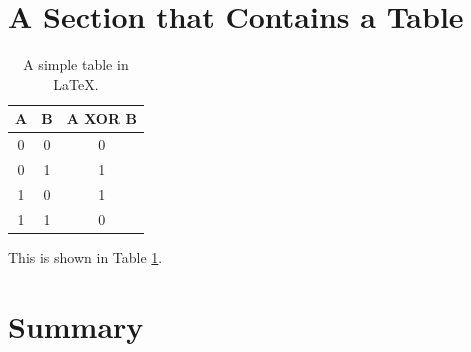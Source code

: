 \section{A Section that Contains a Table}


\begin{table}[ht]
\center
\begin{tabular}{cc|c}
A & B & A XOR B\\
\hline
0 & 0 & 0\\
0 & 1 & 1\\
1 & 0 & 1\\
1 & 1 & 0\\
\end{tabular}
\caption{A simple table in \LaTeX.}
\label{tab:xor}
\end{table}


This is shown in Table \ref{tab:xor}.


\section{Summary}


